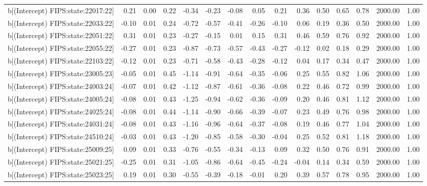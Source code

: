 \begin{table}[ht]
\begin{tabular}{rrrrrrrrrrrrrrr}
  b[(Intercept) FIPS:state:22017:22] & 0.21 & 0.00 & 0.22 & -0.34 & -0.23 & -0.08 & 0.05 & 0.21 & 0.36 & 0.50 & 0.65 & 0.78 & 2000.00 & 1.00 \\ 
  b[(Intercept) FIPS:state:22033:22] & -0.10 & 0.01 & 0.24 & -0.72 & -0.57 & -0.41 & -0.26 & -0.10 & 0.06 & 0.19 & 0.36 & 0.50 & 2000.00 & 1.00 \\ 
  b[(Intercept) FIPS:state:22051:22] & 0.31 & 0.01 & 0.23 & -0.27 & -0.15 & 0.01 & 0.15 & 0.31 & 0.46 & 0.59 & 0.76 & 0.92 & 2000.00 & 1.00 \\ 
  b[(Intercept) FIPS:state:22055:22] & -0.27 & 0.01 & 0.23 & -0.87 & -0.73 & -0.57 & -0.43 & -0.27 & -0.12 & 0.02 & 0.18 & 0.29 & 2000.00 & 1.00 \\ 
  b[(Intercept) FIPS:state:22103:22] & -0.12 & 0.01 & 0.23 & -0.71 & -0.58 & -0.43 & -0.28 & -0.12 & 0.04 & 0.17 & 0.34 & 0.47 & 2000.00 & 1.00 \\ 
  b[(Intercept) FIPS:state:23005:23] & -0.05 & 0.01 & 0.45 & -1.14 & -0.91 & -0.64 & -0.35 & -0.06 & 0.25 & 0.55 & 0.82 & 1.06 & 2000.00 & 1.00 \\ 
  b[(Intercept) FIPS:state:24003:24] & -0.07 & 0.01 & 0.42 & -1.12 & -0.87 & -0.61 & -0.36 & -0.08 & 0.22 & 0.46 & 0.72 & 0.99 & 2000.00 & 1.00 \\ 
  b[(Intercept) FIPS:state:24005:24] & -0.08 & 0.01 & 0.43 & -1.25 & -0.94 & -0.62 & -0.36 & -0.09 & 0.20 & 0.46 & 0.81 & 1.12 & 2000.00 & 1.00 \\ 
  b[(Intercept) FIPS:state:24025:24] & -0.08 & 0.01 & 0.44 & -1.14 & -0.90 & -0.66 & -0.39 & -0.07 & 0.23 & 0.49 & 0.76 & 0.98 & 2000.00 & 1.00 \\ 
  b[(Intercept) FIPS:state:24031:24] & -0.08 & 0.01 & 0.43 & -1.16 & -0.96 & -0.64 & -0.37 & -0.08 & 0.19 & 0.46 & 0.77 & 1.04 & 2000.00 & 1.00 \\ 
  b[(Intercept) FIPS:state:24510:24] & -0.03 & 0.01 & 0.43 & -1.20 & -0.85 & -0.58 & -0.30 & -0.04 & 0.25 & 0.52 & 0.81 & 1.18 & 2000.00 & 1.00 \\ 
  b[(Intercept) FIPS:state:25009:25] & 0.09 & 0.01 & 0.33 & -0.76 & -0.55 & -0.34 & -0.13 & 0.09 & 0.32 & 0.50 & 0.76 & 0.91 & 2000.00 & 1.00 \\ 
  b[(Intercept) FIPS:state:25021:25] & -0.25 & 0.01 & 0.31 & -1.05 & -0.86 & -0.64 & -0.45 & -0.24 & -0.04 & 0.14 & 0.34 & 0.59 & 2000.00 & 1.00 \\ 
  b[(Intercept) FIPS:state:25023:25] & 0.19 & 0.01 & 0.30 & -0.55 & -0.39 & -0.18 & -0.01 & 0.20 & 0.39 & 0.57 & 0.78 & 0.95 & 2000.00 & 1.00 \\ 

\end{tabular}
\end{table}
